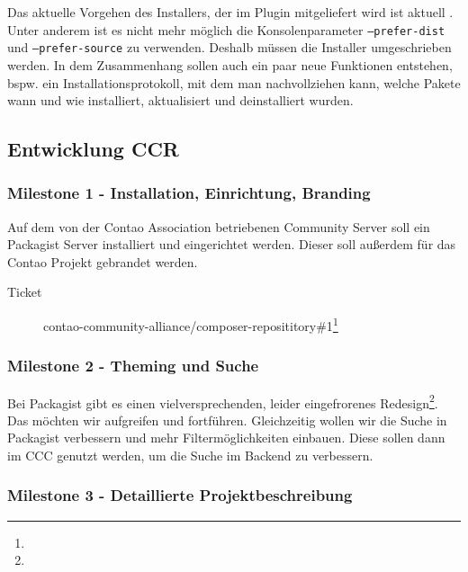 \documentclass[
paper=a4,
draft=false,%
fontsize=10pt%
]{scrartcl}
\begin{document}
Das aktuelle Vorgehen des Installers, der im Plugin mitgeliefert wird ist aktuell . Unter anderem ist es nicht mehr möglich die Konsolenparameter \texttt{--prefer-dist} und \texttt{--prefer-source} zu verwenden. Deshalb müssen die Installer umgeschrieben werden. In dem Zusammenhang sollen auch ein paar neue Funktionen entstehen, bspw. ein Installationsprotokoll, mit dem man nachvollziehen kann, welche Pakete wann und wie installiert, aktualisiert und deinstalliert wurden.

\pagebreak

\subsection{Entwicklung CCR}
\label{subsec:ccr}

\subsubsection{Milestone 1 - Installation, Einrichtung, Branding}
\label{subsec:ccr-milestone-1}

Auf dem von der Contao Association betriebenen Community Server soll ein Packagist Server installiert und eingerichtet werden. Dieser soll außerdem für das Contao Projekt gebrandet werden.

\begin{description}
\item[Ticket] contao-community-alliance/composer-reposititory\#1\footnote{}
\end{description}

\subsubsection{Milestone 2 - Theming und Suche}
\label{subsec:ccr-milestone-2}

Bei Packagist gibt es einen vielversprechenden, leider eingefrorenes Redesign\footnote{}. Das möchten wir aufgreifen und fortführen. Gleichzeitig wollen wir die Suche in Packagist verbessern und mehr Filtermöglichkeiten einbauen. Diese sollen dann im CCC  genutzt werden, um die Suche im Backend zu verbessern.

\subsubsection{Milestone 3 - Detaillierte Projektbeschreibung}
\label{subsec:ccr-milestone-3}
\end{document}
